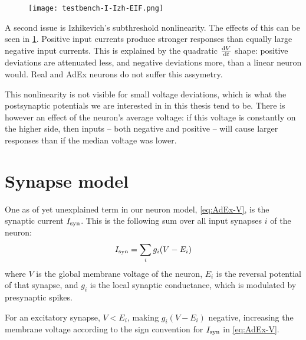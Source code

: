 \begin{figure}
    \hspace*{-2em}
    \texttt{[image: testbench-I-Izh-EIF.png]}
    \label{fig:testbench-I-Izh-EIF}
\end{figure}

A second issue is Izhikevich's subthreshold nonlinearity. The effects of this can be seen in \cref{fig:testbench-I-Izh-EIF}. Positive input currents produce stronger responses than equally large negative input currents. This is explained by the quadratic $\frac{\mathrm{d}V}{\mathrm{d}t}$ shape: positive deviations are attenuated less, and negative deviations more, than a linear neuron would. Real and AdEx neurons do not suffer this assymetry.

This nonlinearity is not visible for small voltage deviations, which is what the postsynaptic potentials we are interested in in this thesis tend to be. There is however an effect of the neuron's average voltage: if this voltage is constantly on the higher side, then inputs -- both negative and positive -- will cause larger responses than if the median voltage was lower.


\clearpage
\section{Synapse model}
\label{sec:synapse_model}

One as of yet unexplained term in our neuron model, \cref{eq:AdEx-V}, is the synaptic current $I_{\text{syn}}$.
This is the following sum over all input synapses $i$ of the neuron:
\begin{equation}
    I_{\text{syn}} = \sum_i g_i (V - E_i)
    \label{eq:I_syn}
\end{equation}
where $V$ is the global membrane voltage of the neuron, $E_i$ is the reversal potential of that synapse, and $g_i$ is the local synaptic conductance, which is modulated by presynaptic spikes.

For an excitatory synapse, $V < E_i$, making $g_i (V - E_i)$ negative, increasing the membrane voltage according to the sign convention for $I_{\text{syn}}$ in \cref{eq:AdEx-V}.

